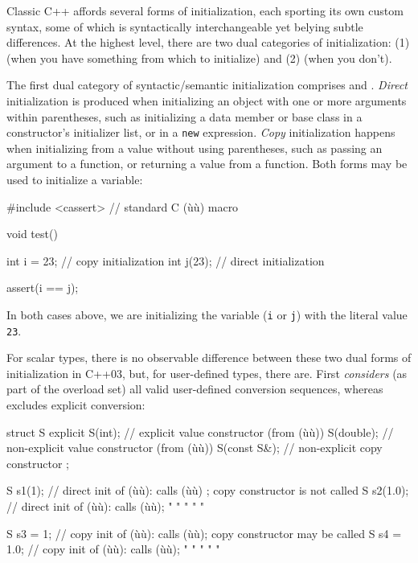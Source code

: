 Classic C++ affords several forms of initialization, each sporting its
own custom syntax, some of which is syntactically interchangeable yet
belying subtle differences. At the highest level, there are two dual
categories of initialization: (1)  (when you have
something from which to initialize) and (2)  (when
you don't).

The first dual category of syntactic/semantic initialization comprises
 and . \emph{Direct} initialization is produced when
initializing an object with one or more arguments within parentheses,
such as initializing a data member or base class in a constructor's
initializer list, or in a \lstinline!new! expression. \emph{Copy}
initialization happens when initializing from a value without using
parentheses, such as passing an argument to a function, or returning a
value from a function. Both forms may be used to initialize a variable:

\begin{emcppslisting}
#include <cassert>  // standard C (ù{}ù) macro

void test()
{
    int i = 23;  // copy initialization
    int j(23);   // direct initialization

    assert(i == j);
}
\end{emcppslisting}
    
\noindent In both cases above, we are initializing the variable (\lstinline!i! or
\lstinline!j!) with the literal value \lstinline!23!.

For scalar types, there is no observable difference between these two
dual forms of initialization in C++03, but, for user-defined types,
there are. First  \emph{considers} (as
part of the overload set) all valid user-defined conversion sequences,
whereas  excludes explicit conversion:

\begin{emcppslisting}
struct S
{
    explicit S(int);       //     explicit value constructor (from (ù{}ù))
             S(double);    // non-explicit value constructor (from (ù{}ù))
             S(const S&);  // non-explicit copy  constructor
};

S s1(1);     // direct init of (ù{}ù): calls (ù{}ù)   ; copy constructor is not called
S s2(1.0);   // direct init of (ù{}ù): calls (ù{}ù);   "      "        "   "     "

S s3 = 1;    // copy init of (ù{}ù):   calls (ù{}ù); copy constructor may be called
S s4 = 1.0;  // copy init of (ù{}ù):   calls (ù{}ù);   "      "         "    "   "
\end{emcppslisting}
    
